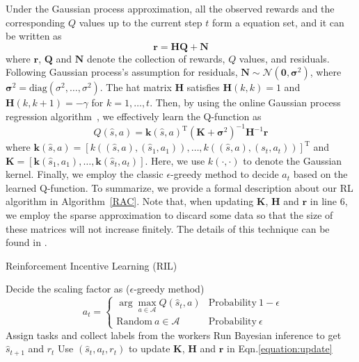 Under the Gaussian process approximation, all the observed rewards and the corresponding $Q$ values up to the current step $t$ form a equation set, and it can be written as
\begin{equation}
\bm{r}=\bm{H}\bm{Q}+\bm{N}
\end{equation}
where $\bm{r}$, $\bm{Q}$ and $\bm{N}$ denote the collection of rewards, $Q$ values, and residuals. Following Gaussian process's assumption for residuals, $\bm{N}\sim \mathcal{N}(\bm{0},\bm{\sigma}^2)$, where $\bm{\sigma}^2=\textrm{diag}(\sigma^2,\ldots,\sigma^2)$.
The hat matrix $\bm{H}$ satisfies $\bm{H}(k,k)=1$ and $\bm{H}(k,k+1)=-\gamma$ for $k=1,\ldots, t$.
Then, by using the online Gaussian process regression algorithm~\cite{engel2005reinforcement}, we effectively learn the Q-function as
\begin{equation}
\label{equation:update}
Q(\hat{s},a) = \bm{k}(\hat{s},a) ^{\mathrm{T}}(\bm{K} +\bm{\sigma}^2)^{-1}\bm{H}^{-1}\bm{r}
\end{equation}
where $\bm{k}(\hat{s},a)=[k((\hat{s},a), (\hat{s}_1,a_1)),\ldots, k((\hat{s},a), (s_t,a_t))]^{\mathrm{T}}$ and $\bm{K}=[\bm{k}(\hat{s}_1,a_1),\ldots,\bm{k}(\hat{s}_t,a_t)]$. Here, we use $k(\cdot, \cdot)$ to denote the Gaussian kernel.
Finally, we employ the classic $\epsilon$-greedy method to decide $a_t$ based on the learned Q-function.
To summarize, we provide a formal description about our RL algorithm in Algorithm~\ref{RAC}. Note that, when updating $\bm{K}$, $\bm{H}$ and $\bm{r}$ in line 6, we employ the sparse approximation to discard some data so that the size of these matrices will not increase finitely. The details of this technique can be found in \citet{gasic2014gaussian}.

\begin{algorithm}[tb]
   \caption{Reinforcement Incentive Learning (RIL)}
   \label{RAC}
   \small
\begin{algorithmic}[1]
   \STATE Decide the scaling factor as ($\epsilon$-greedy method)
   			\vspace{-3mm}
			$$\ \ a_t=\left\{
			\begin{array}{ll}
				\arg\max_{a\in\mathcal{A}}Q(\hat{s}_t,a) & \mathrm{Probability\ } 1-\epsilon\\
				\mathrm{Random\ } a\in\mathcal{A} & \mathrm{Probability\ } \epsilon
			\end{array}						
			 \right.$$  
			 \vspace{-3mm} 
   \STATE Assign tasks and collect labels from the workers
   \STATE Run Bayesian inference to get $\hat{s}_{t+1}$ and $r_t$
   \STATE Use $(\hat{s}_t, a_t, r_t)$ to update $\bm{K}$, $\bm{H}$ and $\bm{r}$ in Eqn.\ref{equation:update}
   \ENDFOR
   \ENDFOR
\end{algorithmic}
\end{algorithm}


